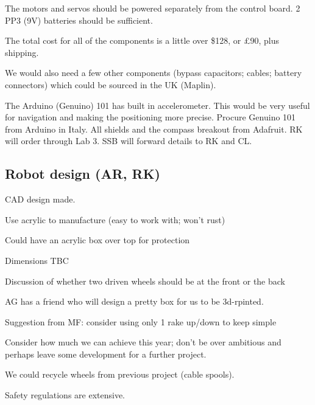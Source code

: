 \documentclass[a4paper,11pt,twoside,class=meetingmins,crop=false]{standalone}
\begin{document}
\begin{items}
\begin{hiddenitems}
    \item The motors and servos should be powered separately from the control board. 2 PP3 (9V) batteries should be sufficient.
    \item The total cost for all of the components is a little over \${128}, or \pounds{90}, plus shipping.
    \item We would also need a few other components (bypass capacitors; cables; battery connectors) which could be sourced in the UK (\eg Maplin).
    \item The Arduino (Genuino) 101 has built in accelerometer. This would be very useful for navigation and making the positioning more precise.
    \decisions Procure Genuino 101 from Arduino in Italy. All shields and the compass breakout from Adafruit. RK will order through Lab 3. SSB will forward details to RK and CL.
\end{hiddenitems}



\subsection{Robot design (AR, RK)}
    \item CAD design made.
    \item Use acrylic to manufacture (easy to work with; won't rust)
    \item Could have an acrylic box over top for protection
    \item Dimensions TBC
    \item Discussion of whether two driven wheels should be at the front or the back
    \item AG has a friend who will design a pretty box for us to be 3d-rpinted.
    \item Suggestion from MF: consider using only 1 rake up/down to keep simple
    \item Consider how much we can achieve this year; don't be over ambitious and perhaps leave some development for a further project.
    \item We could recycle wheels from previous project (cable spools).
    \item Safety regulations are extensive.


\end{items}
\end{document}
